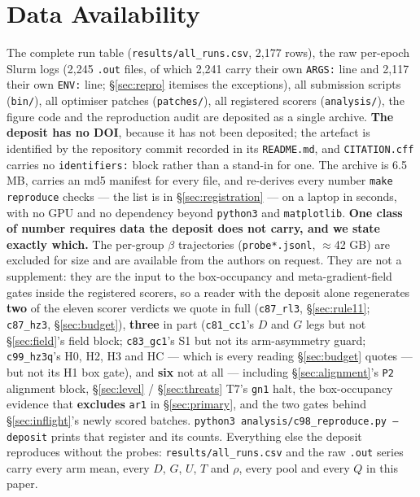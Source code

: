 \documentclass[10pt,letterpaper]{article}
\newcommand{\Dstat}{D}                         %
\newcommand{\Gstat}{G}                         %
\newcommand{\Tstat}{T}                         %
\newcommand{\Ustat}{U}                         %
\newcommand{\arm}[1]{\texttt{#1}}
\begin{document}
\section*{Data Availability}
The complete run table (\texttt{results/all\_runs.csv}, 2{,}177 rows), the raw per-epoch Slurm logs
(2{,}245 \texttt{.out} files, of which 2{,}241 carry their own \texttt{ARGS:} line and
2{,}117 their own \texttt{ENV:} line; \S\ref{sec:repro} itemises the exceptions), all
submission scripts (\texttt{bin/}), all optimiser patches (\texttt{patches/}), all registered
scorers (\texttt{analysis/}), the figure code and the reproduction audit are deposited as a single
archive. \textbf{The deposit has no DOI}, because it has not been deposited; the artefact is
identified by the repository commit recorded in its \texttt{README.md}, and \texttt{CITATION.cff}
carries no \texttt{identifiers:} block rather than a stand-in for one. The archive
is 6.5 MB, carries an md5 manifest for every file, and re-derives every number
\texttt{make reproduce} checks --- the list is in \S\ref{sec:registration} --- on a laptop in
seconds, with no GPU and no dependency beyond
\texttt{python3} and \texttt{matplotlib}. \textbf{One class of number requires data the deposit
does not carry, and we state exactly which.} The per-group $\beta$
trajectories (\texttt{probe*.jsonl}, $\approx$42 GB) are excluded for size and are available from
the authors on request. They are not a supplement: they are the input to the box-occupancy and
meta-gradient-field gates inside the registered scorers, so a reader with the deposit alone
regenerates \textbf{two} of the eleven scorer verdicts we quote in full (\texttt{c87\_rl3},
\S\ref{sec:rule11}; \texttt{c87\_hz3}, \S\ref{sec:budget}), \textbf{three} in part
(\texttt{c81\_cc1}'s $\Dstat$ and $\Gstat$ legs but not \S\ref{sec:field}'s field block;
\texttt{c83\_gc1}'s S1 but not its arm-asymmetry guard; \texttt{c99\_hz3q}'s H0, H2, H3 and HC ---
which is every reading \S\ref{sec:budget} quotes --- but not its H1 box gate), and \textbf{six} not
at all --- including
\S\ref{sec:alignment}'s \texttt{P2} alignment block, \S\ref{sec:level} / \S\ref{sec:threats} T7's
\arm{gn1} halt, the box-occupancy evidence that \textbf{excludes} \arm{ar1} in
\S\ref{sec:primary}, and the two gates behind \S\ref{sec:inflight}'s newly scored batches.
\texttt{python3 analysis/c98\_reproduce.py --deposit} prints that register and its counts.
Everything else the deposit reproduces without the probes: \texttt{results/all\_runs.csv} and the
raw \texttt{.out} series carry every arm mean, every $\Dstat$, $\Gstat$, $\Ustat$, $\Tstat$ and
$\rho$, every pool and every $Q$ in this paper.
\end{document}
